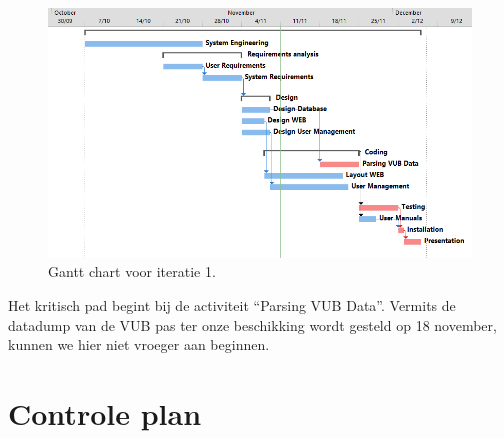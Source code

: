 \begin{figure} [H]
	\centering
	\includegraphics[width = \textwidth]{ManagerialProcess/GanttChartIT1.png}	
	\caption{Gantt chart voor iteratie 1.}
	\label{fig:GantChartIT1}
\end{figure}
Het kritisch pad begint bij de activiteit ``Parsing VUB Data''.  Vermits de datadump van de VUB pas ter onze beschikking wordt gesteld op 18 november, kunnen we hier niet vroeger aan beginnen.

\section{Controle plan}
